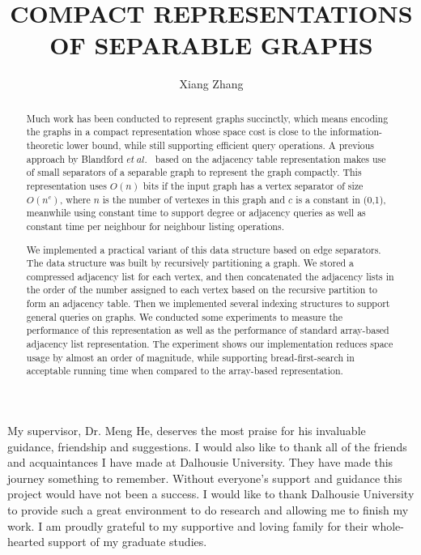\documentclass[12pt,glossary]{dalthesis}
\begin{document}
\macs  %
\title{COMPACT REPRESENTATIONS OF SEPARABLE GRAPHS}
\author{Xiang Zhang}





\frontmatter





\begin{abstract}
Much work has been conducted to represent graphs succinctly, which means encoding the graphs in a compact representation whose space cost is close to the information-theoretic lower bound, while still supporting efficient query operations. A previous approach by Blandford $et \ al.$~\cite{compact-representation} based on the adjacency table representation makes use of small separators of a separable graph to represent the graph compactly. This representation uses $O(n)$ bits if the input graph has a vertex separator of size $O(n^{c})$, where $n$ is the number of vertexes in this graph and $c$ is a constant in (0,1), meanwhile using constant time to support degree or adjacency queries as well as constant time per neighbour for neighbour listing operations.


We implemented a practical variant of this data structure based on edge separators. The data structure was built by recursively partitioning a graph. We stored a compressed adjacency list for each vertex, and then concatenated the adjacency lists in the order of the number assigned to each vertex based on the recursive partition to form an adjacency table. Then we implemented several indexing structures to support general queries on graphs. We conducted some experiments to measure the performance of this representation as well as the performance of standard array-based adjacency list representation. The experiment shows our implementation reduces space usage by almost an order of magnitude, while supporting bread-first-search in acceptable running time when compared to the array-based representation.
\end{abstract}

\printglossary

\begin{acknowledgements}
My supervisor, Dr. Meng He, deserves the most praise for his invaluable guidance, friendship and suggestions. I would also like to thank all of the friends and acquaintances I have made at Dalhousie University. They have made this journey something to remember. Without everyone’s support and guidance this project would have not been a success.
I would like to thank Dalhousie University to provide such a great environment
to do research and allowing me to finish my work.
I am proudly grateful to my supportive and loving family for their whole-hearted
support of my graduate studies.
\end{acknowledgements}
\end{document}
